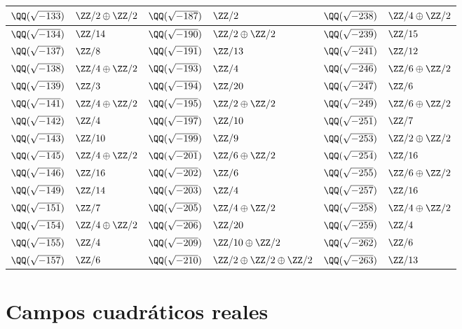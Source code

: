 \begin{center}
\begin{tabular}{x{2cm}x{2.5cm}x{2cm}x{2.5cm}x{2cm}x{2.5cm}}
$\QQ (\sqrt{-133})$ & $\ZZ/2\oplus\ZZ/2$ & $\QQ (\sqrt{-187})$ & $\ZZ/2$ & $\QQ (\sqrt{-238})$ & $\ZZ/4\oplus\ZZ/2$ \tabularnewline\hline
$\QQ (\sqrt{-134})$ & $\ZZ/14$ & $\QQ (\sqrt{-190})$ & $\ZZ/2\oplus\ZZ/2$ & $\QQ (\sqrt{-239})$ & $\ZZ/15$ \tabularnewline\hline
$\QQ (\sqrt{-137})$ & $\ZZ/8$ & $\QQ (\sqrt{-191})$ & $\ZZ/13$ & $\QQ (\sqrt{-241})$ & $\ZZ/12$ \tabularnewline\hline
$\QQ (\sqrt{-138})$ & $\ZZ/4\oplus\ZZ/2$ & $\QQ (\sqrt{-193})$ & $\ZZ/4$ & $\QQ (\sqrt{-246})$ & $\ZZ/6\oplus\ZZ/2$ \tabularnewline\hline
$\QQ (\sqrt{-139})$ & $\ZZ/3$ & $\QQ (\sqrt{-194})$ & $\ZZ/20$ & $\QQ (\sqrt{-247})$ & $\ZZ/6$ \tabularnewline\hline
$\QQ (\sqrt{-141})$ & $\ZZ/4\oplus\ZZ/2$ & $\QQ (\sqrt{-195})$ & $\ZZ/2\oplus\ZZ/2$ & $\QQ (\sqrt{-249})$ & $\ZZ/6\oplus\ZZ/2$ \tabularnewline\hline
$\QQ (\sqrt{-142})$ & $\ZZ/4$ & $\QQ (\sqrt{-197})$ & $\ZZ/10$ & $\QQ (\sqrt{-251})$ & $\ZZ/7$ \tabularnewline\hline
$\QQ (\sqrt{-143})$ & $\ZZ/10$ & $\QQ (\sqrt{-199})$ & $\ZZ/9$ & $\QQ (\sqrt{-253})$ & $\ZZ/2\oplus\ZZ/2$ \tabularnewline\hline
$\QQ (\sqrt{-145})$ & $\ZZ/4\oplus\ZZ/2$ & $\QQ (\sqrt{-201})$ & $\ZZ/6\oplus\ZZ/2$ & $\QQ (\sqrt{-254})$ & $\ZZ/16$ \tabularnewline\hline
$\QQ (\sqrt{-146})$ & $\ZZ/16$ & $\QQ (\sqrt{-202})$ & $\ZZ/6$ & $\QQ (\sqrt{-255})$ & $\ZZ/6\oplus\ZZ/2$ \tabularnewline\hline
$\QQ (\sqrt{-149})$ & $\ZZ/14$ & $\QQ (\sqrt{-203})$ & $\ZZ/4$ & $\QQ (\sqrt{-257})$ & $\ZZ/16$ \tabularnewline\hline
$\QQ (\sqrt{-151})$ & $\ZZ/7$ & $\QQ (\sqrt{-205})$ & $\ZZ/4\oplus\ZZ/2$ & $\QQ (\sqrt{-258})$ & $\ZZ/4\oplus\ZZ/2$ \tabularnewline\hline
$\QQ (\sqrt{-154})$ & $\ZZ/4\oplus\ZZ/2$ & $\QQ (\sqrt{-206})$ & $\ZZ/20$ & $\QQ (\sqrt{-259})$ & $\ZZ/4$ \tabularnewline\hline
$\QQ (\sqrt{-155})$ & $\ZZ/4$ & $\QQ (\sqrt{-209})$ & $\ZZ/10\oplus\ZZ/2$ & $\QQ (\sqrt{-262})$ & $\ZZ/6$ \tabularnewline\hline
$\QQ (\sqrt{-157})$ & $\ZZ/6$ & $\QQ (\sqrt{-210})$ & $\ZZ/2\oplus\ZZ/2\oplus\ZZ/2$ & $\QQ (\sqrt{-263})$ & $\ZZ/13$ \tabularnewline\hline
\end{tabular}
\end{center}

\pagebreak


\section{Campos cuadráticos reales}
\label{ap:grupos-de-clases-cuadraticos-reales}

